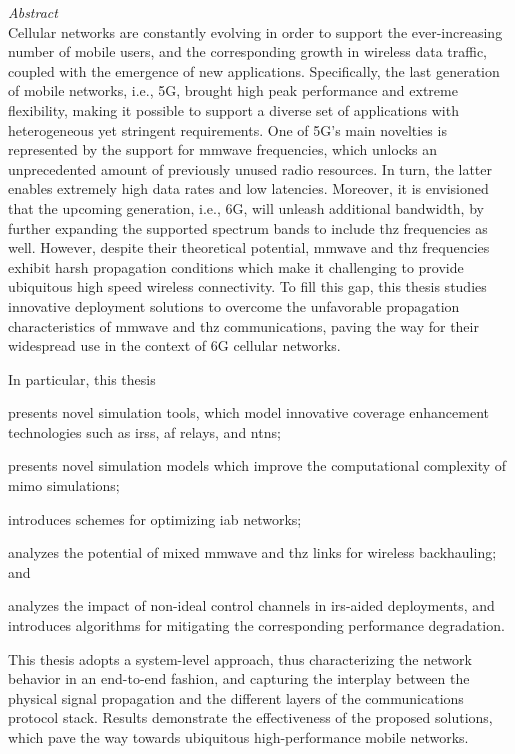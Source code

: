 {\noindent\huge\itshape Abstract}\\
%

Cellular networks are constantly evolving in order to support the ever-increasing number of mobile users, and the corresponding growth in wireless data traffic, coupled with the emergence of new applications. 
Specifically, the last generation of mobile networks, i.e., 5G, brought high peak performance and extreme flexibility, making it possible to support a diverse set of applications with heterogeneous yet stringent requirements. 
One of 5G's main novelties is represented by the support for \gls{mmwave} frequencies, which unlocks an unprecedented amount of previously unused radio resources. In turn, the latter enables extremely high data rates and low latencies. Moreover, it is envisioned that the upcoming generation, i.e., 6G, will unleash additional bandwidth, by further expanding the supported spectrum bands to include \gls{thz} frequencies as well. 
However, despite their theoretical potential, \gls{mmwave} and \gls{thz} frequencies exhibit harsh propagation conditions which make it challenging to provide ubiquitous high speed wireless connectivity. 
To fill this gap, this thesis studies innovative deployment solutions to overcome the unfavorable propagation characteristics of \gls{mmwave} and \gls{thz} communications, paving the way for their widespread use in the context of 6G cellular networks. 

In particular, this thesis
\begin{enumerate*}[label=(\roman*)]
    \item presents novel simulation tools, which model innovative coverage enhancement technologies such as \glspl{irs}, \gls{af} relays, and \glspl{ntn};
    \item presents novel simulation models which improve the computational complexity of \gls{mimo} simulations;
    \item introduces schemes for optimizing \gls{iab} networks;
    \item analyzes the potential of mixed \gls{mmwave} and \gls{thz} links for wireless backhauling; and
    \item analyzes the impact of non-ideal control channels in \gls{irs}-aided deployments, and introduces algorithms for mitigating the corresponding performance degradation.
\end{enumerate*}

This thesis adopts a system-level approach, thus characterizing the network behavior in an end-to-end fashion, and capturing the interplay between the physical signal propagation and the different layers of the communications protocol stack. Results demonstrate the effectiveness of the proposed solutions, which pave the way towards ubiquitous high-performance mobile networks.
